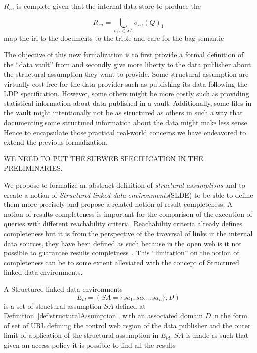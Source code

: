 $R_{sa}$ is complete given that the internal data store to produce the  

\begin{equation}
   R_{sa} = \bigcup_{\sigma_{sa} \in SA} \sigma_{sa}(Q)_1 
\end{equation}
map the iri to the documents to the triple and care for the bag semantic


The objective of this new formalization is to first provide a formal definition of the ``data vault'' from \citeauthor{Taelman2023} and secondly give more liberty to the data publisher about the structural assumption they want to provide.
Some structural assumption are virtually cost-free for the data provider such as publishing its data following the LDP specification.
However, some others might be more costly such as providing statistical information about data published in a vault.
Additionally, some files in the vault might intentionally not be as structured as others in such a way that documenting some structured information about the 
data might make less sense. Hence to encapsulate those practical real-world concerns we have endeavored to extend the previous formalization.

WE NEED TO PUT THE SUBWEB SPECIFICATION IN THE PRELIMINARIES.

\iffalse
We propose to formalize an abstract definition of \emph{structural assumptions} and to create a notion of \emph{Structured linked data environments}(SLDE)
to be able to define them more precisely and propose a related notion of result completeness.
A notion of results completeness is important for the comparison of the execution of queries with different reachability criteria.
Reachability criteria already defines completeness but it is from the perspective of the traversal of links in the internal data sources,
they have been defined as such because in the open web is it not possible to guarantee results completness~\cite{Hartig2012}.
This ``limitation'' on the notion of completeness can be to some extent alleviated with the concept of Structured linked data environments.

A Structured linked data environments 
\begin{equation}
E_{ld} = (SA=\{ sa_1, sa_2...sa_n\}, D)
\end{equation}
is a set of structural assumption $SA$  defined at Definition~\ref{def:structuralAssumption},
with an associated domain $D$ in the form of set of URL defining the control web region of the data publisher and the outer limit of application of the structural assumption in $E_{ld}$.
$SA$ is made as such that given an access policy it is possible to find all the results 

